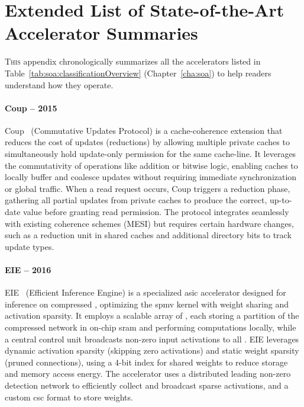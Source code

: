 
\section{Extended List of State-of-the-Art Accelerator Summaries}
\label{app:other_acc}

\lettrine{T}{his} appendix chronologically summarizes all the accelerators listed in Table~\ref{tab:soa:classificationOverview} (Chapter~\ref{cha:soa}) to help readers understand how they operate.

\paragraph{Coup -- 2015}

Coup~\cite{Zhang2015_Coup} (Commutative Updates Protocol) is a cache-coherence extension that reduces the cost of updates (\ie \glspl{reduction}) by allowing multiple private caches to simultaneously hold update-only permission for the same cache-line.
It leverages the commutativity of operations like addition or bitwise logic, enabling caches to locally buffer and coalesce updates without requiring immediate synchronization or global traffic.
When a read request occurs, Coup triggers a \gls{reduction} phase, gathering all partial updates from private caches to produce the correct, up-to-date value before granting read permission.
The protocol integrates seamlessly with existing coherence schemes (\eg MESI) but requires certain hardware changes, such as a \gls{reduction} unit in shared caches and additional directory bits to track update types.

\paragraph{EIE -- 2016}

EIE~\cite{Han2016_EIE} (Efficient Inference Engine) is a specialized \acrshort{asic} accelerator designed for inference on compressed , optimizing the \acrshort{spmv} kernel with weight sharing and activation sparsity.
It employs a scalable array of , each storing a partition of the compressed network in on-chip \acrshort{sram} and performing computations locally, while a central control unit broadcasts non-zero input activations to all .
EIE leverages dynamic activation sparsity (skipping zero activations) and static weight sparsity (pruned connections), using a 4-bit index for shared weights to reduce storage and memory access energy.
The accelerator uses a distributed leading non-zero detection network to efficiently collect and broadcast sparse activations, and a custom \acrshort{csc} format to store weights.%

